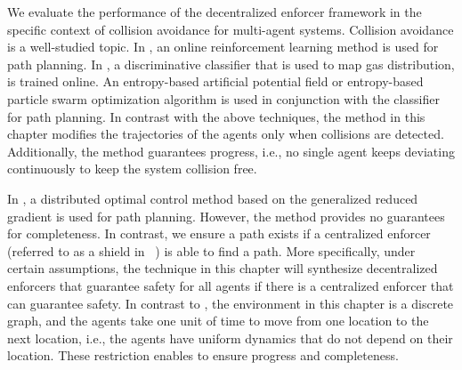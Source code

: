 We evaluate the performance of the decentralized enforcer framework in the specific context of collision avoidance for multi-agent systems.
Collision avoidance is a well-studied topic. In \cite{Zhu2020AdaptiveOD}, an online reinforcement learning method is used for path planning. 
In \cite{Zhu2019}, a discriminative classifier that is used to map gas distribution, is trained online. An entropy-based artificial potential field or entropy-based particle swarm optimization algorithm is used in conjunction with the classifier for path planning. In contrast with the above techniques, the method in this chapter modifies the trajectories of the agents only when collisions are detected. Additionally, the method guarantees progress, i.e., no single agent keeps deviating continuously to keep the system collision free. 
 
In \cite{Rudd2017}, a distributed optimal control method based on the generalized reduced gradient is used for path planning. However, the method provides no guarantees for completeness. In contrast, we ensure a path exists if a centralized enforcer (referred to as a shield in ~\cite{BharNFM}) is able to find a path. More specifically, under certain assumptions, the technique in this chapter will synthesize decentralized enforcers that guarantee safety for all agents if there is a centralized enforcer that can guarantee safety. %
In contrast to \cite{AlAbri2020ADO}, the environment in this chapter is a discrete graph, and the agents take one unit of time to move from one location to the next location, i.e., the agents have uniform dynamics that do not depend on their location. These restriction enables to ensure progress and completeness.


